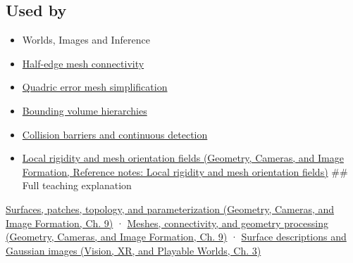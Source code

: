 \subsection{Used by}\label{appendix-fab348609369-used-by}

\begin{itemize}
\item
  {Worlds, Images and Inference}
\item
  \hyperref[appendix-1aea26b2307f]{Half-edge mesh connectivity}
\item
  \hyperref[appendix-1dd4ad54ca57]{Quadric error mesh simplification}
\item
  \hyperref[appendix-0b426c47dd78]{Bounding volume hierarchies}
\item
  \hyperref[appendix-a9ba01fa72a6]{Collision barriers and continuous detection}
\item
  \href{../03-Geometry-Cameras-and-Image-Formation/main.pdf\#nameddest=appendix-7107009c505b}{Local rigidity and mesh orientation fields (Geometry, Cameras, and Image Formation, Reference notes: Local rigidity and mesh orientation fields)} \#\# Full teaching explanation
\end{itemize}

\href{../03-Geometry-Cameras-and-Image-Formation/main.pdf\#nameddest=03-visual-computing-i-ch002-surfaces-patches-topology-and-parameterization}{Surfaces, patches, topology, and parameterization (Geometry, Cameras, and Image Formation, Ch. 9)} · \href{../03-Geometry-Cameras-and-Image-Formation/main.pdf\#nameddest=03-visual-computing-i-ch002-meshes-connectivity-and-geometry-processing}{Meshes, connectivity, and geometry processing (Geometry, Cameras, and Image Formation, Ch. 9)} · \href{../07-Vision-XR-and-Playable-Worlds/main.pdf\#nameddest=04-visual-computing-ii-ch032-surface-descriptions-and-gaussian-images}{Surface descriptions and Gaussian images (Vision, XR, and Playable Worlds, Ch. 3)}
